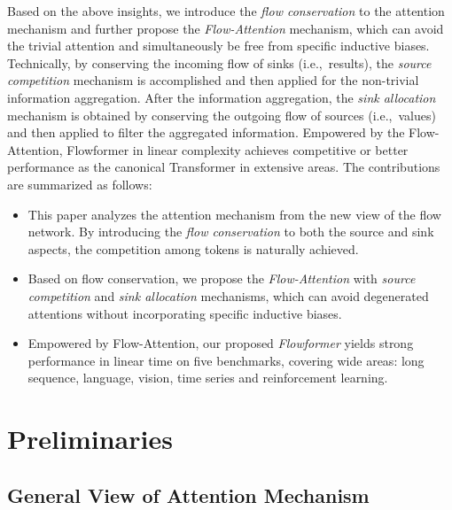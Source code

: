 \documentclass[nohyperref]{article}
\theoremstyle{plain}
\theoremstyle{definition}
\theoremstyle{remark}
\begin{document}
Based on the above insights, we introduce the \emph{flow conservation} to the attention mechanism and further propose the \emph{Flow-Attention} mechanism, which can avoid the trivial attention and simultaneously be free from specific inductive biases. Technically, by conserving the incoming flow of sinks (i.e.,~results), the \emph{source competition} mechanism is accomplished and then applied for the non-trivial information aggregation. After the information aggregation, the \emph{sink allocation} mechanism is obtained by conserving the outgoing flow of sources (i.e.,~values) and then applied to filter the aggregated information. Empowered by the Flow-Attention, Flowformer in linear complexity achieves competitive or better performance as the canonical Transformer in extensive areas.
The contributions are summarized as follows:
\begin{itemize}
    \vspace{-5pt}
  \item This paper analyzes the attention mechanism from the new view of the flow network. By introducing the \emph{flow conservation} to both the source and sink aspects, the competition among tokens is naturally achieved.
  \vspace{-3pt}
  \item Based on flow conservation, we propose the \emph{Flow-Attention} with \emph{source competition} and \emph{sink allocation} mechanisms, which can avoid degenerated attentions without incorporating specific inductive biases.
  \vspace{-3pt}
  \item Empowered by Flow-Attention, our proposed \emph{Flowformer} yields strong performance in linear time on five benchmarks, covering wide areas: long sequence, language, vision, time series and reinforcement learning.
\end{itemize}


\section{Preliminaries}
\vspace{-3pt}
\subsection{General View of Attention Mechanism}
\vspace{-3pt}
\end{document}
